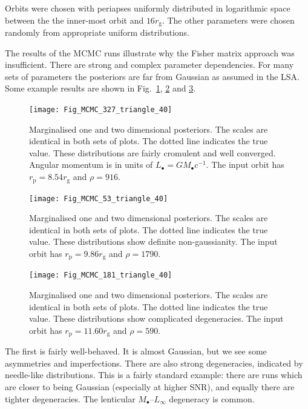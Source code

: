 \documentclass[useAMS,usedcolumn,usegraphicx,usenatbib]{mn2e}
\newcommand{\figref}[1]{Fig.~\ref{fig:#1}}
\newcommand{\sub}[1]{\ensuremath{_\mathrm{#1}}}
\begin{document}
Orbits were chosen with periapses uniformly distributed in logarithmic space between the the inner-most orbit and $16 r\sub{g}$. The other parameters were chosen randomly from appropriate uniform distributions. 

The results of the MCMC runs illustrate why the Fisher matrix approach was insufficient. There are strong and complex parameter dependencies. For many sets of parameters the posteriors are far from Gaussian as assumed in the LSA. Some example results are shown in \figref{MCMC-1}, \ref{fig:MCMC-2} and \ref{fig:MCMC-3}.
\begin{figure}
\begin{center}
   \texttt{[image: Fig\_MCMC\_327\_triangle\_40]}
\caption{Marginalised one and two dimensional posteriors. The scales are identical in both sets of plots. The dotted line indicates the true value. These distributions are fairly cromulent and well converged. Angular momentum is in units of $L_\bullet = GM_\bullet c^{-1}$. The input orbit has $r\sub{p} = 8.54 r\sub{g}$ and $\rho = 916$.\label{fig:MCMC-1}}
\end{center}
\end{figure}
\begin{figure}
\begin{center}
   \texttt{[image: Fig\_MCMC\_53\_triangle\_40]}
\caption{Marginalised one and two dimensional posteriors. The scales are identical in both sets of plots. The dotted line indicates the true value. These distributions show definite non-gaussianity. The input orbit has $r\sub{p} = 9.86 r\sub{g}$ and $\rho = 1790$.\label{fig:MCMC-2}}
\end{center}
\end{figure}
\begin{figure}
\begin{center}
   \texttt{[image: Fig\_MCMC\_181\_triangle\_40]}
\caption{Marginalised one and two dimensional posteriors. The scales are identical in both sets of plots. The dotted line indicates the true value. These distributions show complicated degeneracies. The input orbit has $r\sub{p} = 11.60 r\sub{g}$ and $\rho = 590$.}
\label{fig:MCMC-3}
\end{center}
\end{figure}

The first is fairly well-behaved. It is almost Gaussian, but we see some asymmetries and imperfections. There are also strong degeneracies, indicated by needle-like distributions. This is a fairly standard example: there are runs which are closer to being Gaussian (especially at higher SNR), and equally there are tighter degeneracies. The lenticular $M_\bullet$--$L_\infty$ degeneracy is common.
\end{document}

